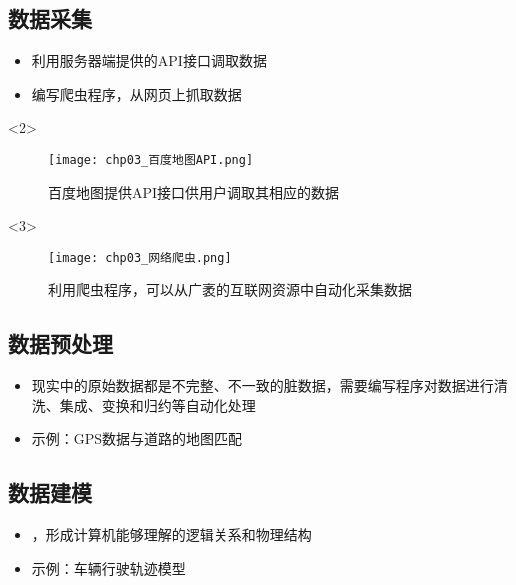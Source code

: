 \subsection{数据采集}
\begin{frame}[t]{\subsecname}
\begin{itemize}
\item<2-> 利用服务器端提供的API接口调取数据
\item<3-> 编写爬虫程序，从网页上抓取数据
\end{itemize}

\begin{overlayarea}{\textwidth}{\textheight}
  \begin{onlyenv}<2>
\begin{figure}
  \centering
  \texttt{[image: chp03\_百度地图API.png]}
  \caption{百度地图提供API接口供用户调取其相应的数据}
\end{figure}
  \end{onlyenv}

\vspace{-15pt}
  \begin{onlyenv}<3>
\begin{figure}
  \texttt{[image: chp03\_网络爬虫.png]}
  \caption{利用爬虫程序，可以从广袤的互联网资源中自动化采集数据}
\end{figure}
  \end{onlyenv}
\end{overlayarea}

\end{frame}

\subsection{数据预处理}
\begin{frame}[t]{\subsecname}
\begin{itemize}
\item<1-> 现实中的原始数据都是不完整、不一致的脏数据，需要编写程序对数据进行清洗、集成、变换和归约等自动化处理
\item<2-> 示例：GPS数据与道路的地图匹配
\end{itemize}
\end{frame}

\subsection{数据建模}
\begin{frame}[t]{}
\begin{itemize}
\item<1-> ，形成计算机能够理解的逻辑关系和物理结构
\item<2-> 示例：车辆行驶轨迹模型 
\end{itemize}
\end{frame}

